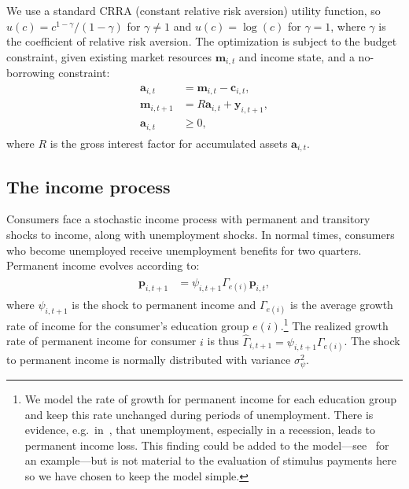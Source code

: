 \documentclass[\latexroot/\projectname]{subfiles}
\begin{document}
We use a standard CRRA (constant relative risk aversion) utility function, so $u(c) = c^{1-\gamma}/(1-\gamma)$ for $\gamma \neq 1$ and $u(c) = \log(c)$ for $\gamma=1$, where $\gamma$ is the coefficient of relative risk aversion.
The optimization is subject to the budget constraint, given existing market resources $\mathbf{m}_{i,t}$ and income state, and a no-borrowing constraint:
\begin{equation}
  \begin{gathered}
    \begin{aligned}
      \mathbf{a}_{i,t}   & = \mathbf{m}_{i,t} - \mathbf{c}_{i,t},     \\
      \mathbf{m}_{i,t+1} & = R \mathbf{a}_{i,t} + \mathbf{y}_{i,t+1}, \\
      \mathbf{a}_{i,t}   & \geq 0,
    \end{aligned}
  \end{gathered}
\end{equation}
where $R$ is the gross interest factor for accumulated assets $\mathbf{a}_{i,t}$.

\subsection{The income process}\whenintegrated{\label{the-income-process}}

Consumers face a stochastic income process with permanent and transitory shocks to income, along with unemployment shocks.
In normal times, consumers who become unemployed receive unemployment benefits for two quarters.
Permanent income evolves according to:
\begin{equation}
  \begin{gathered}
    \begin{aligned}
      \mathbf{p}_{i,t+1} & = \psi_{i,t+1}\Gamma_{e(i)}\mathbf{p}_{i,t},
    \end{aligned}
  \end{gathered}
\end{equation}
where $\psi_{i,t+1}$ is the shock to permanent income and $\Gamma_{e(i)}$ is the average growth rate of income for the consumer's education group $e(i)$.\footnote{We model the rate of growth for permanent income for each education group and keep this rate unchanged during periods of unemployment.
  There is evidence, e.g.\ in~\cite{davis-recessions-2011}, that unemployment, especially in a recession, leads to permanent income loss.
  This finding could be added to the model---see~\cite{carroll2020modeling} for an example---but is not material to the evaluation of stimulus payments here so we have chosen to keep the model simple.
} The realized growth rate of permanent income for consumer $i$ is thus $\hat{\Gamma}_{i,t+1} = \psi_{i,t+1} \Gamma_{e(i)}$.
The shock to permanent income is normally distributed with variance $\sigma_{\psi}^2$.
\end{document}
